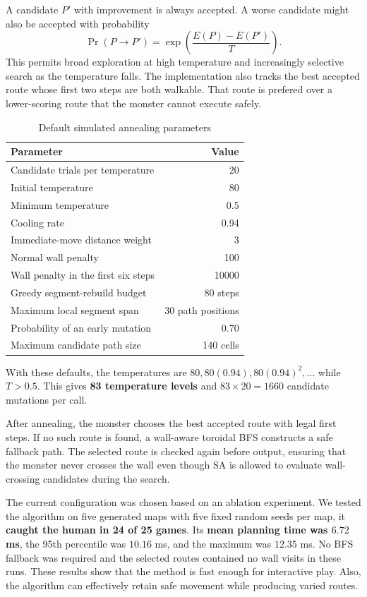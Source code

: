 \documentclass[12pt,a4paper]{article}
\begin{document}
A candidate $P'$ with improvement is always accepted. A worse candidate might also be
accepted with probability
\[
\Pr(P\rightarrow P')=
\exp\left(\frac{E(P)-E(P')}{T}\right).
\]
This permits broad exploration at high temperature and increasingly selective
search as the temperature falls. The implementation also tracks the best
accepted route whose first two steps are both walkable. That route
is prefered over a lower-scoring route that the monster cannot execute safely.

\begin{table}[H]
\centering
\caption{Default simulated annealing parameters}
\begin{tabular}{lr}
\toprule
Parameter & Value \\
\midrule
Candidate trials per temperature & 20 \\
Initial temperature & 80 \\
Minimum temperature & 0.5 \\
Cooling rate & 0.94 \\
Immediate-move distance weight & 3 \\
Normal wall penalty & 100 \\
Wall penalty in the first six steps & 10000 \\
Greedy segment-rebuild budget & 80 steps \\
Maximum local segment span & 30 path positions \\
Probability of an early mutation & 0.70 \\
Maximum candidate path size & 140 cells \\
\bottomrule
\end{tabular}
\end{table}

With these defaults, the temperatures are $80,80(0.94),80(0.94)^2,\ldots$
while $T>0.5$. This gives \textbf{83 temperature levels} and \textbf{$83\times20=1660$}
candidate mutations per call. 

After annealing, the monster chooses the best accepted route with legal first
steps. If no such route is found, a wall-aware toroidal BFS constructs a safe
fallback path. The selected route is checked again before output, ensuring
that the monster never crosses the wall even though SA is
allowed to evaluate wall-crossing candidates during the search.

The current configuration was chosen based on an ablation experiment.
We tested the algorithm on five generated maps with five fixed random seeds per map,
it \textbf{caught the human in 24 of 25 games}. Its \textbf{mean planning time was $6.72$ ms}, the 95th
percentile was $10.16$ ms, and the maximum was $12.35$ ms. No BFS fallback
was required and the selected routes contained no wall visits in these runs.
These results show that the method is fast enough for interactive play.
Also, the algorithm can effectively retain safe movement while producing varied routes.
\end{document}
